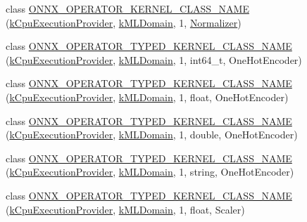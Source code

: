 \begin{DoxyCompactItemize}
\item 
class \mbox{\hyperlink{namespaceonnxruntime_1_1ml_a9ec007497b86e981b970684dc9b30ab0}{O\+N\+N\+X\+\_\+\+O\+P\+E\+R\+A\+T\+O\+R\+\_\+\+K\+E\+R\+N\+E\+L\+\_\+\+C\+L\+A\+S\+S\+\_\+\+N\+A\+ME}} (\mbox{\hyperlink{namespaceonnxruntime_a394a3c7e50622de1f203a96df592060d}{k\+Cpu\+Execution\+Provider}}, \mbox{\hyperlink{namespaceonnxruntime_a76df7dd63759039fc62486d6691e70e5}{k\+M\+L\+Domain}}, 1, \mbox{\hyperlink{classonnxruntime_1_1ml_1_1Normalizer}{Normalizer}})
\item 
class \mbox{\hyperlink{namespaceonnxruntime_1_1ml_a598c3e17bafc064c48fa4067420eab71}{O\+N\+N\+X\+\_\+\+O\+P\+E\+R\+A\+T\+O\+R\+\_\+\+T\+Y\+P\+E\+D\+\_\+\+K\+E\+R\+N\+E\+L\+\_\+\+C\+L\+A\+S\+S\+\_\+\+N\+A\+ME}} (\mbox{\hyperlink{namespaceonnxruntime_a394a3c7e50622de1f203a96df592060d}{k\+Cpu\+Execution\+Provider}}, \mbox{\hyperlink{namespaceonnxruntime_a76df7dd63759039fc62486d6691e70e5}{k\+M\+L\+Domain}}, 1, int64\+\_\+t, One\+Hot\+Encoder)
\item 
class \mbox{\hyperlink{namespaceonnxruntime_1_1ml_a5554d68a4eddedca620f7e912f201227}{O\+N\+N\+X\+\_\+\+O\+P\+E\+R\+A\+T\+O\+R\+\_\+\+T\+Y\+P\+E\+D\+\_\+\+K\+E\+R\+N\+E\+L\+\_\+\+C\+L\+A\+S\+S\+\_\+\+N\+A\+ME}} (\mbox{\hyperlink{namespaceonnxruntime_a394a3c7e50622de1f203a96df592060d}{k\+Cpu\+Execution\+Provider}}, \mbox{\hyperlink{namespaceonnxruntime_a76df7dd63759039fc62486d6691e70e5}{k\+M\+L\+Domain}}, 1, float, One\+Hot\+Encoder)
\item 
class \mbox{\hyperlink{namespaceonnxruntime_1_1ml_a5d9d9955a1eb323b2cad1988009b944b}{O\+N\+N\+X\+\_\+\+O\+P\+E\+R\+A\+T\+O\+R\+\_\+\+T\+Y\+P\+E\+D\+\_\+\+K\+E\+R\+N\+E\+L\+\_\+\+C\+L\+A\+S\+S\+\_\+\+N\+A\+ME}} (\mbox{\hyperlink{namespaceonnxruntime_a394a3c7e50622de1f203a96df592060d}{k\+Cpu\+Execution\+Provider}}, \mbox{\hyperlink{namespaceonnxruntime_a76df7dd63759039fc62486d6691e70e5}{k\+M\+L\+Domain}}, 1, double, One\+Hot\+Encoder)
\item 
class \mbox{\hyperlink{namespaceonnxruntime_1_1ml_afdf5bf8eb96ef2ad816f1b7b73ed53e7}{O\+N\+N\+X\+\_\+\+O\+P\+E\+R\+A\+T\+O\+R\+\_\+\+T\+Y\+P\+E\+D\+\_\+\+K\+E\+R\+N\+E\+L\+\_\+\+C\+L\+A\+S\+S\+\_\+\+N\+A\+ME}} (\mbox{\hyperlink{namespaceonnxruntime_a394a3c7e50622de1f203a96df592060d}{k\+Cpu\+Execution\+Provider}}, \mbox{\hyperlink{namespaceonnxruntime_a76df7dd63759039fc62486d6691e70e5}{k\+M\+L\+Domain}}, 1, string, One\+Hot\+Encoder)
\item 
class \mbox{\hyperlink{namespaceonnxruntime_1_1ml_ab1e1a80612c5e1271ba92d85e40e2066}{O\+N\+N\+X\+\_\+\+O\+P\+E\+R\+A\+T\+O\+R\+\_\+\+T\+Y\+P\+E\+D\+\_\+\+K\+E\+R\+N\+E\+L\+\_\+\+C\+L\+A\+S\+S\+\_\+\+N\+A\+ME}} (\mbox{\hyperlink{namespaceonnxruntime_a394a3c7e50622de1f203a96df592060d}{k\+Cpu\+Execution\+Provider}}, \mbox{\hyperlink{namespaceonnxruntime_a76df7dd63759039fc62486d6691e70e5}{k\+M\+L\+Domain}}, 1, float, Scaler)

\end{DoxyCompactItemize}

